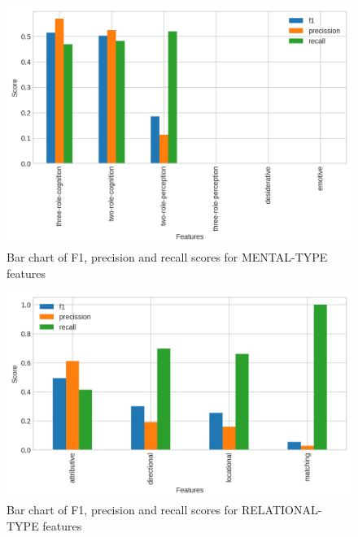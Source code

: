     \begin{figure}[!ht]
        \centering
        \includegraphics[width=.65\textwidth]{evaluation-results/figures/accuracy-semantic-mental-type-f1}
        \caption{Bar chart of F1, precision and recall scores for MENTAL-TYPE features}
        \label{fig:mental-types}
    \end{figure}
    
    \begin{figure}[!ht]
        \centering
        \includegraphics[width=.65\textwidth]{evaluation-results/figures/accuracy-semantic-relational-type-f1}
        \caption{Bar chart of F1, precision and recall scores for RELATIONAL-TYPE features}
        \label{fig:relational-types}
    \end{figure}


